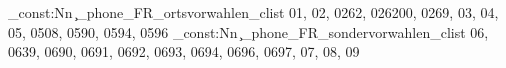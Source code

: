 \clist_const:Nn \c_phone_FR_ortsvorwahlen_clist {01,
02,
0262,
026200,
0269,
03,
04,
05,
0508,
0590,
0594,
0596}
\clist_const:Nn \c_phone_FR_sondervorwahlen_clist {06,
0639,
0690,
0691,
0692,
0693,
0694,
0696,
0697,
07,
08,
09}
